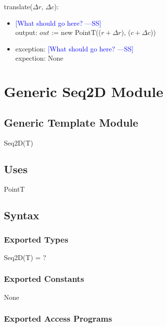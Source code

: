 \documentclass[12pt]{article}
\newcommand{\authornote}[3]{\textcolor{#1}{[#3 ---#2]}}
\newcommand{\authornote}[3]{}
\newcommand{\wss}[1]{\authornote{blue}{SS}{#1}}
\begin{document}
\noindent translate($\Delta r$, $\Delta c$):
\begin{itemize}
\item \wss{What should go here?}\\
output: $out$ := new PointT(($r+\Delta r$), ($c+\Delta c$))

\item exception: \wss{What should go here?}\\
expection: None
\end{itemize}

\newpage

\section* {Generic Seq2D Module}

\subsection* {Generic Template Module}

Seq2D(T)

\subsection* {Uses}

PointT

\subsection* {Syntax}

\subsubsection* {Exported Types}

Seq2D(T) = ?

\subsubsection* {Exported Constants}

None

\subsubsection* {Exported Access Programs}
\end{document}
